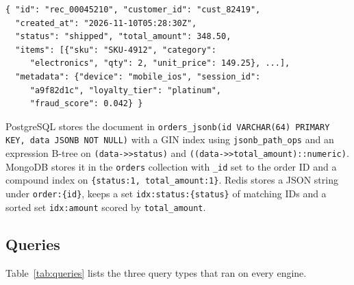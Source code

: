 \documentclass[conference,a4paper]{IEEEtran}
\newcommand{\code}[1]{\texttt{\small #1}}
\newcommand{\sq}{\textquotesingle}
\begin{document}
\noindent\begin{minipage}{\columnwidth}\footnotesize
\begin{verbatim}
{ "id": "rec_00045210", "customer_id": "cust_82419",
  "created_at": "2026-11-10T05:28:30Z",
  "status": "shipped", "total_amount": 348.50,
  "items": [{"sku": "SKU-4912", "category":
     "electronics", "qty": 2, "unit_price": 149.25}, ...],
  "metadata": {"device": "mobile_ios", "session_id":
     "a9f82d1c", "loyalty_tier": "platinum",
     "fraud_score": 0.042} }
\end{verbatim}\end{minipage}\par\vspace{3pt}

PostgreSQL stores the document in \code{orders\_jsonb(id VARCHAR(64) PRIMARY KEY, data JSONB NOT NULL)} with a GIN index using \code{jsonb\_path\_ops} and an expression B-tree on \code{(data->>\sq status\sq)} and \code{((data->>\sq total\_amount\sq)::numeric)}. MongoDB stores it in the \code{orders} collection with \code{\_id} set to the order ID and a compound index on \code{\{status:1, total\_amount:1\}}. Redis stores a JSON string under \code{order:\{id\}}, keeps a set \code{idx:status:\{status\}} of matching IDs and a sorted set \code{idx:amount} scored by \code{total\_amount}.

\subsection{Queries}
Table~\ref{tab:queries} lists the three query types that ran on every engine.
\end{document}
